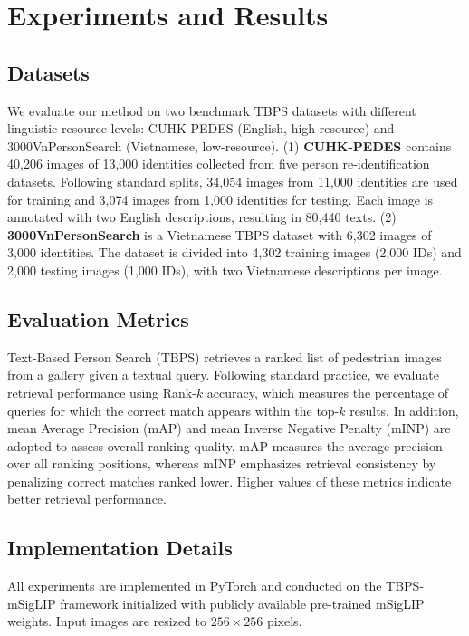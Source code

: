 \documentclass[conference]{IEEEtran}
\begin{document}
\section{Experiments and Results}\label{eexp}

\subsection{Datasets}
We evaluate our method on two benchmark TBPS datasets with different linguistic resource levels: CUHK-PEDES \cite{Li_2017_CVPR} (English, high-resource) and 3000VnPersonSearch \cite{pham2022towards} (Vietnamese, low-resource). (1) \textbf{CUHK-PEDES} contains 40,206 images of 13,000 identities collected from five person re-identification datasets. Following standard splits, 34,054 images from 11,000 identities are used for training and 3,074 images from 1,000 identities for testing. Each image is annotated with two English descriptions, resulting in 80,440 texts. (2) \textbf{3000VnPersonSearch} is a Vietnamese TBPS dataset with 6,302 images of 3,000 identities. The dataset is divided into 4,302 training images (2,000 IDs) and 2,000 testing images (1,000 IDs), with two Vietnamese descriptions per image.

\subsection{Evaluation Metrics}
Text-Based Person Search (TBPS) retrieves a ranked list of pedestrian images from a gallery given a textual query. Following standard practice, we evaluate retrieval performance using Rank-$k$ accuracy, which measures the percentage of queries for which the correct match appears within the top-$k$ results. 
In addition, mean Average Precision (mAP) and mean Inverse Negative Penalty (mINP) are adopted to assess overall ranking quality. mAP measures the average precision over all ranking positions, whereas mINP emphasizes retrieval consistency by penalizing correct matches ranked lower. Higher values of these metrics indicate better retrieval performance.

\subsection{Implementation Details}
All experiments are implemented in PyTorch and conducted on the TBPS-mSigLIP framework initialized with publicly available pre-trained mSigLIP weights. Input images are resized to $256 \times 256$ pixels. 
\end{document}
